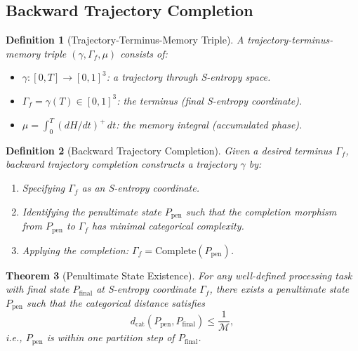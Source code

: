 \documentclass[twocolumn,10pt]{article}
\newtheorem{theorem}{Theorem}[section]
\newtheorem{definition}[theorem]{Definition}
\theoremstyle{remark}
\newcommand{\Depth}{\mathcal{M}}
\begin{document}
\subsection{Backward Trajectory Completion}

\begin{definition}[Trajectory-Terminus-Memory Triple]
\label{def:ttm}
A trajectory-terminus-memory triple $(\gamma, \Gamma_f, \mu)$ consists of:
\begin{itemize}
\item $\gamma: [0, T] \to [0,1]^3$: a trajectory through S-entropy space.
\item $\Gamma_f = \gamma(T) \in [0,1]^3$: the terminus (final S-entropy coordinate).
\item $\mu = \int_0^T (dH/dt)^+ \, dt$: the memory integral (accumulated phase).
\end{itemize}
\end{definition}

\begin{definition}[Backward Trajectory Completion]
\label{def:backward}
Given a desired terminus $\Gamma_f$, backward trajectory completion constructs a trajectory $\gamma$ by:
\begin{enumerate}
\item Specifying $\Gamma_f$ as an S-entropy coordinate.
\item Identifying the penultimate state $P_{\mathrm{pen}}$ such that the completion morphism from $P_{\mathrm{pen}}$ to $\Gamma_f$ has minimal categorical complexity.
\item Applying the completion: $\Gamma_f = \mathrm{Complete}(P_{\mathrm{pen}})$.
\end{enumerate}
\end{definition}

\begin{theorem}[Penultimate State Existence]
\label{thm:penultimate}
For any well-defined processing task with final state $P_{\mathrm{final}}$ at S-entropy coordinate $\Gamma_f$, there exists a penultimate state $P_{\mathrm{pen}}$ such that the categorical distance satisfies
\begin{equation}
d_{\mathrm{cat}}(P_{\mathrm{pen}}, P_{\mathrm{final}}) \leq \frac{1}{\Depth},
\label{eq:penultimate}
\end{equation}
i.e., $P_{\mathrm{pen}}$ is within one partition step of $P_{\mathrm{final}}$.
\end{theorem}
\end{document}
